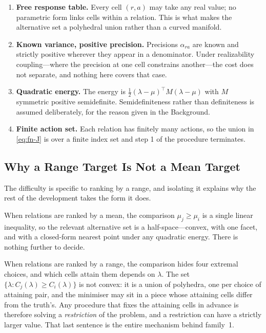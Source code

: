 \documentclass[conference]{IEEEtran}
\theoremstyle{definition}
\begin{document}
\begin{enumerate}
\item[1)] \textbf{Free response table.} Every cell $(r,a)$ may take any real value; no
parametric form links cells within a relation. This is what makes the alternative set a
polyhedral union rather than a curved manifold.

\item[2)] \textbf{Known variance, positive precision.} Precisions $\alpha_{ra}$ are known and
strictly positive wherever they appear in a denominator. Under realizability coupling---where
the precision at one cell constrains another---the cost does not separate, and nothing here
covers that case.

\item[3)] \textbf{Quadratic energy.} The energy is $\tfrac12(\lambda-\mu)^{\top}M(\lambda-\mu)$
with $M$ symmetric positive semidefinite. Semidefiniteness rather than definiteness is
assumed deliberately, for the reason given in the Background.

\item[4)] \textbf{Finite action set.} Each relation has finitely many actions, so the union in
\eqref{eq:fn-J} is over a finite index set and step 1 of the procedure terminates.
\end{enumerate}

\subsection{Why a Range Target Is Not a Mean Target}

The difficulty is specific to ranking by a range, and isolating it explains why the rest of
the development takes the form it does.

When relations are ranked by a mean, the comparison $\mu_{j}\ge\mu_{i}$ is a single linear
inequality, so the relevant alternative set is a half-space---convex, with one facet, and
with a closed-form nearest point under any quadratic energy. There is nothing further to
decide.

When relations are ranked by a range, the comparison hides four extremal choices, and which
cells attain them depends on $\lambda$. The set $\{\lambda:C_{j}(\lambda)\ge C_{i}(\lambda)\}$
is not convex: it is a union of polyhedra, one per choice of attaining pair, and the
minimiser may sit in a piece whose attaining cells differ from the truth's. Any procedure
that fixes the attaining cells in advance is therefore solving a \emph{restriction} of the
problem, and a restriction can have a strictly larger value. That last sentence is the entire
mechanism behind family~1.
\end{document}
